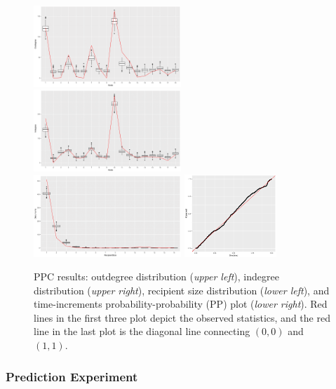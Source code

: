 \documentclass[12pt]{article}
\begin{document}
	\begin{figure}[!t]
		\centering
		\includegraphics[width=0.495\textwidth]{plots_paper/outdegreenew-1.png}	
		\includegraphics[width=0.495\textwidth]{plots_paper/indegreenew-1.png}	
		\includegraphics[width=0.495\textwidth]{plots_paper/recipientsizenew-1.png}	
		\includegraphics[width=0.31\textwidth]{plots_paper/timeppnew.pdf}
		\caption {PPC results: outdegree distribution (\textit{upper left}), indegree distribution (\textit{upper right}), recipient size distribution (\textit{lower left}), and time-increments probability-probability (PP) plot  (\textit{lower right}). Red lines in the first three plot depict the observed statistics, and the red line in the last plot is the diagonal line connecting $(0, 0)$ and $(1, 1)$.}
		\label{figure:PPCresults}
	\end{figure}
	\subsubsection{Prediction Experiment}\label{subsubsec:Experiment_email}
	
\end{document}
